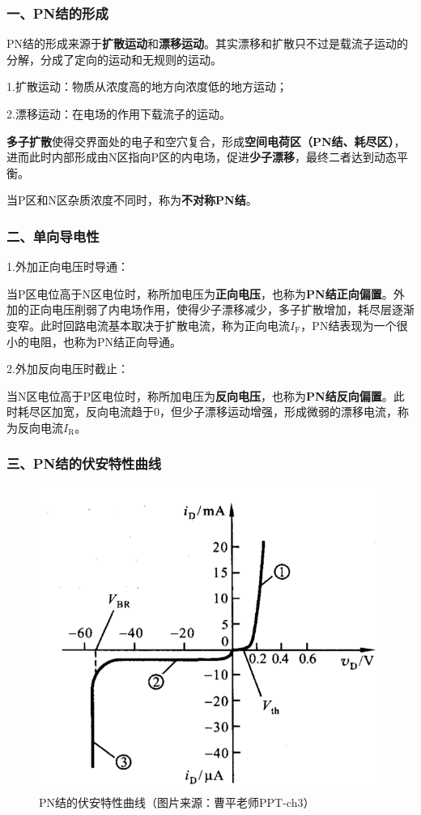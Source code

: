 \subsubsection{一、PN结的形成}
PN结的形成来源于\textbf{扩散运动}和\textbf{漂移运动}。其实漂移和扩散只不过是载流子运动的分解，分成了定向的运动和无规则的运动。

1.扩散运动：物质从浓度高的地方向浓度低的地方运动；

2.漂移运动：在电场的作用下载流子的运动。

\textbf{多子扩散}使得交界面处的电⼦和空⽳复合，形成\textbf{空间电荷区（PN结、耗尽区）}，进而此时内部形成由N区指向P区的内电场，促进\textbf{少子漂移}，最终二者达到动态平衡。

当P区和N区杂质浓度不同时，称为\textbf{不对称PN结}。

\subsubsection{二、单向导电性}
1.外加正向电压时导通：

当P区电位高于N区电位时，称所加电压为\textbf{正向电压}，也称为\textbf{PN结正向偏置}。外加的正向电压削弱了内电场作用，使得少子漂移减少，多子扩散增加，耗尽层逐渐变窄。此时回路电流基本取决于扩散电流，称为正向电流$I_\mathrm{F}$，PN结表现为一个很小的电阻，也称为PN结正向导通。

2.外加反向电压时截止：

当N区电位高于P区电位时，称所加电压为\textbf{反向电压}，也称为\textbf{PN结反向偏置}。此时耗尽区加宽，反向电流趋于0，但少子漂移运动增强，形成微弱的漂移电流，称为反向电流$I_\mathrm{R}$。

\subsubsection{三、PN结的伏安特性曲线}

\begin{figure}[htb]
    \centering
    \includegraphics[width=0.5\linewidth]{pic/锗PN结的伏安特性曲线.png}
    \caption{PN结的伏安特性曲线（图片来源：曹平老师PPT-ch3）\label{PN结的伏安特性曲线}}
\end{figure}

